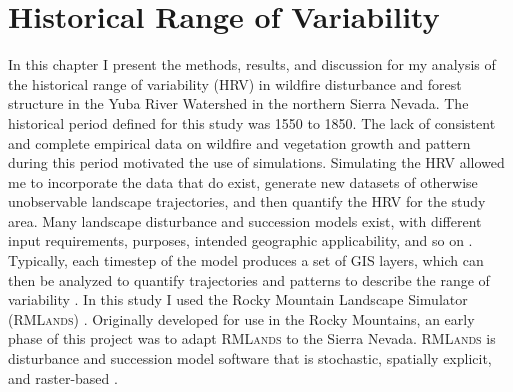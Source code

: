 
\chapter{Historical Range of Variability}
\label{ch:hrv}

In this chapter I present the methods, results, and discussion for my analysis of the historical range of variability (HRV) in wildfire disturbance and forest structure in the Yuba River Watershed in the northern Sierra Nevada. The historical period defined for this study was 1550 to 1850. The lack of consistent and complete empirical data on wildfire and vegetation growth and pattern during this period motivated the use of simulations. Simulating the HRV allowed me to incorporate the data that do exist, generate new datasets of otherwise unobservable landscape trajectories, and then quantify the HRV for the study area. Many landscape disturbance and succession models exist, with different input requirements, purposes, intended geographic applicability, and so on \citep{Keane2004}. Typically, each timestep of the model produces a set of GIS layers, which can then be analyzed to quantify trajectories and patterns to describe the range of variability \citep{Keane2004}. In this study I used the Rocky Mountain Landscape Simulator (\textsc{RMLands}) \citep{McGarigal2001}. Originally developed for use in the Rocky Mountains, an early phase of this project was to adapt \textsc{RMLands} to the Sierra Nevada. \textsc{RMLands} is disturbance and succession model software that is stochastic, spatially explicit, and raster-based \citep{Cushman2011}. 





